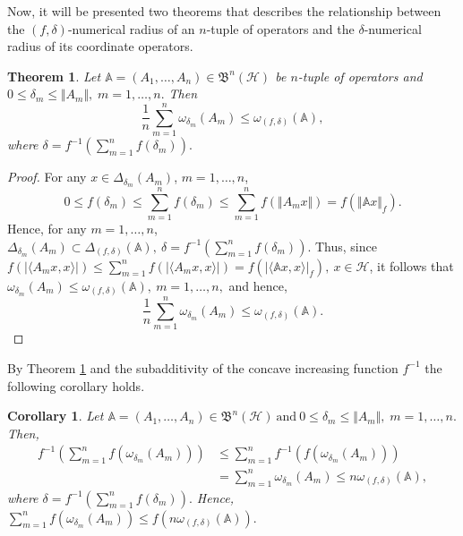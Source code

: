 \documentclass[12pt]{article}
\newtheorem{theorem}{Theorem}
\newtheorem{corollary}{Corollary}
\begin{document}
Now, it will be presented two theorems that describes the relationship between
the $(f,\delta)$-numerical radius of an $n$-tuple of operators and the $\delta$-numerical
radius of its coordinate operators.
\begin{theorem}
\label{thm4}
Let $  \mathbb{A} = (A_1, \ldots, A_n) \in \mathfrak{B}^{n}(\mathcal{H})$  be $n$-tuple of operators and $
0 \leq \delta_m \leq \Vert A_m \Vert,\; m=1,\ldots,n. $ Then
\[
\frac{1}{n} \sum\limits_{m=1}^n \omega_{\delta_m}(A_m)
\leq
\omega_{(f,\delta)}(\mathbb{A}),
\]
where
\(
\delta = f^{-1}\left( \sum\limits_{m=1}^n f(\delta_m) \right).
\)

\end{theorem}
\begin{proof}
For any $x \in \Delta_{\delta_m}(A_m)$, $m=1,\ldots,n$,
\[
0 \leq f(\delta_m)
\leq \sum\limits_{m=1}^n f(\delta_m)
\leq \sum\limits_{m=1}^n f(\Vert A_m x\Vert)
= f(\Vert \mathbb{A}x\Vert_f).
\]
Hence, for any $m = 1,\ldots,n$,
\(
\Delta_{\delta_m}(A_m) \subset \Delta_{(f,\delta)}(\mathbb{A}),
\
\delta = f^{-1}\left( \sum\limits_{m=1}^n f(\delta_m) \right).
\)
Thus, since
\(
f\left(\vert \langle A_{m}x,x\rangle \vert \right)  \leq \sum\limits_{m=1}^n f\left( \vert \langle A_{m}x,x\rangle \vert \right)
= f\left( \vert \langle \mathbb{A}x,x\rangle  \vert_{f} \right) , \ x \in \mathcal{H}
\),
it follows that
\(
\omega_{\delta_m}(A_m)
\leq
\omega_{(f,\delta)}(\mathbb{A}), \ m=1,\ldots, n,
\)
and hence,
\[
\frac{1}{n} \sum\limits_{m=1}^n \omega_{\delta_m}(A_m)
\leq
\omega_{(f,\delta)}(\mathbb{A}).
\tag*{\qedhere} \]
\end{proof}

By Theorem \ref{thm4} and the subadditivity of the concave increasing function $ f^{-1} $ the following corollary holds.
\begin{corollary}
\label{cor5}
Let $  \mathbb{A} = (A_1, \ldots, A_n) \in \mathfrak{B}^{n}(\mathcal{H})
\ \text{and} \
0 \leq \delta_m \leq \Vert A_m \Vert,\; m=1,\ldots,n . $ Then,
\begin{align*}
f^{-1}\left( \sum\limits_{m=1}^{n}f\left(\omega_{\delta_{m}}(A_{m}) \right) \right) & \leq \sum\limits_{m=1}^{n} f^{-1}\left( f\left(\omega_{\delta_{m}}(A_{m}) \right) \right) \\
&= \sum\limits_{m=1}^{n}\omega_{\delta_{m}}(A_{m}) \leq n \omega_{(f,\delta)}(\mathbb{A}),
\end{align*}
where
\(
\delta = f^{-1}\left( \sum\limits_{m=1}^n f(\delta_m) \right).
\)
Hence,
\(
\sum\limits_{m=1}^{n}f\left( \omega_{\delta_{m}}(A_{m}) \right) \leq f\left(n \omega_{(f,\delta)}(\mathbb{A}) \right) .
\)
\end{corollary}
\end{document}
